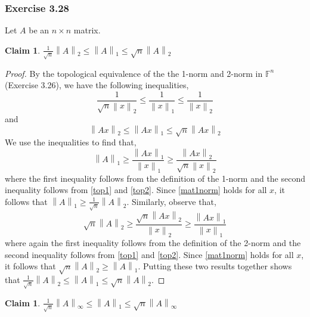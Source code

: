 \documentclass[letterpaper,12pt]{article}
\theoremstyle{definition}
\newtheorem{claim}[theorem]{Claim}
\newcommand{\norm}[1]{\left\lVert#1\right\rVert}
\begin{document}
\subsubsection*{Exercise 3.28}
Let $A$ be an $n\times n$ matrix. 
\begin{claim}
	$\frac{1}{\sqrt{n}} \norm{A}_2 \leq \norm{A}_1 \leq \sqrt{n}\norm{A}_2$
\end{claim}
\begin{proof}
	By the topological equivalence of the the 1-norm and 2-norm in $\mathbb{F}^n$ (Exercise 3.26), we have the following inequalities,
	\begin{equation}\label{top1}
	\frac{1}{\sqrt{n}\norm{x}_2} \leq \frac{1}{\norm{x}_1} \leq \frac{1}{\norm{x}_2}
	\end{equation}
	and
	\begin{equation}\label{top2}
	\norm{Ax}_2 \leq \norm{Ax}_1 \leq \sqrt{n} \norm{Ax}_2
	\end{equation}
	We use the inequalities to find that,
	\begin{equation}\label{mat1norm}
	\norm{A}_1 \geq \frac{\norm{Ax}_1}{\norm{x}_1}
					 \geq \frac{\norm{Ax}_2}{\sqrt{n}\norm{x}_2}
	\end{equation}
	where the first inequality follows from the definition of the 1-norm and the second inequality follows from \eqref{top1} and \eqref{top2}. Since \eqref{mat1norm} holds for all $x$, it follows that $\norm{A}_1 \geq \frac{1}{\sqrt{n}} \norm{A}_2$. Similarly, observe that,
	\begin{equation}
	\sqrt{n}\norm{A}_2 \geq \frac{\sqrt{n}\norm{Ax}_2}{\norm{x}_2} \geq \frac{\norm{Ax}_1}{\norm{x}_1}
	\end{equation}
	where again the first inequality follows from the definition of the 2-norm and the second inequality follows from \eqref{top1} and \eqref{top2}. Since \eqref{mat1norm} holds for all $x$, it follows that $\sqrt{n}\norm{A}_2 \geq \norm{A}_1$. Putting these two results together shows that  $\frac{1}{\sqrt{n}} \norm{A}_2 \leq \norm{A}_1 \leq \sqrt{n}\norm{A}_2$. 
\end{proof}

\begin{claim}
	$\frac{1}{\sqrt{n}} \norm{A}_{\infty} \leq \norm{A}_1 \leq \sqrt{n}\norm{A}_{\infty} $
\end{claim}
\end{document}
